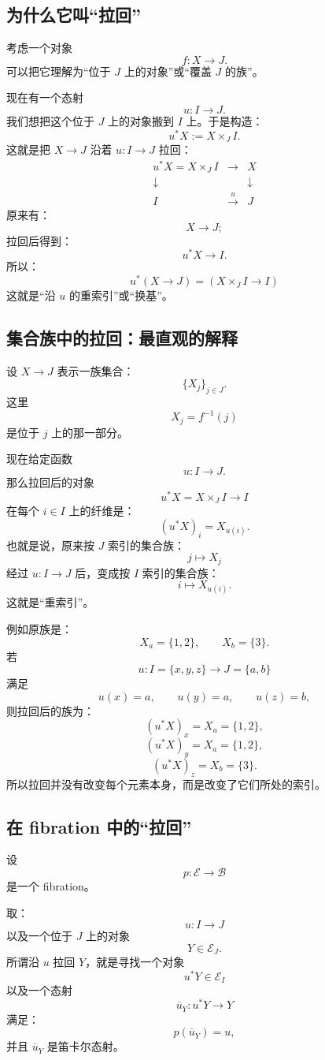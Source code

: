 \documentclass[12pt,a4paper]{article}
\begin{document}
\subsection{为什么它叫“拉回”}

考虑一个对象
\[
f:X\to J.
\]
可以把它理解为“位于 \(J\) 上的对象”或“覆盖 \(J\) 的族”。

现在有一个态射
\[
u:I\to J.
\]
我们想把这个位于 \(J\) 上的对象搬到 \(I\) 上。于是构造：
\[
u^*X:=X\times_J I.
\]
这就是把 \(X\to J\) 沿着 \(u:I\to J\) 拉回：
\[
\begin{array}{ccc}
u^*X=X\times_J I &\to& X\\
\downarrow &&\downarrow\\
I&\xrightarrow{u}&J
\end{array}
\]
原来有：
\[
X\to J;
\]
拉回后得到：
\[
u^*X\to I.
\]
所以：
\[
\boxed{
u^*(X\to J)
=
(X\times_J I\to I)
}
\]
这就是“沿 \(u\) 的重索引”或“换基”。

\subsection{集合族中的拉回：最直观的解释}

设 \(X\to J\) 表示一族集合：
\[
\{X_j\}_{j\in J}.
\]
这里
\[
X_j=f^{-1}(j)
\]
是位于 \(j\) 上的那一部分。

现在给定函数
\[
u:I\to J.
\]
那么拉回后的对象
\[
u^*X=X\times_J I\to I
\]
在每个 \(i\in I\) 上的纤维是：
\[
(u^*X)_i=X_{u(i)}.
\]
也就是说，原来按 \(J\) 索引的集合族：
\[
j\longmapsto X_j
\]
经过 \(u:I\to J\) 后，变成按 \(I\) 索引的集合族：
\[
i\longmapsto X_{u(i)}.
\]
这就是“重索引”。

例如原族是：
\[
X_a=\{1,2\},\qquad X_b=\{3\}.
\]
若
\[
u:I=\{x,y,z\}\to J=\{a,b\}
\]
满足
\[
u(x)=a,\qquad u(y)=a,\qquad u(z)=b,
\]
则拉回后的族为：
\[
(u^*X)_x=X_a=\{1,2\},
\]
\[
(u^*X)_y=X_a=\{1,2\},
\]
\[
(u^*X)_z=X_b=\{3\}.
\]
所以拉回并没有改变每个元素本身，而是改变了它们所处的索引。

\subsection{在 fibration 中的“拉回”}

设
\[
p:\mathcal{E}\to\mathcal{B}
\]
是一个 fibration。

取：
\[
u:I\to J
\]
以及一个位于 \(J\) 上的对象
\[
Y\in\mathcal{E}_J.
\]
所谓沿 \(u\) 拉回 \(Y\)，就是寻找一个对象
\[
u^*Y\in\mathcal{E}_I
\]
以及一个态射
\[
\overline{u}_Y:u^*Y\to Y
\]
满足：
\[
p(\overline{u}_Y)=u,
\]
并且 \(\overline{u}_Y\) 是笛卡尔态射。
\end{document}
